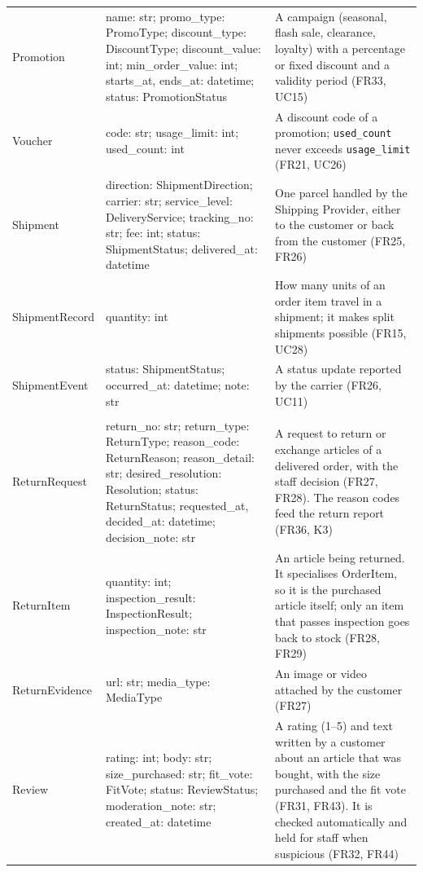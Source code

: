 {\begin{xltabular}{\textwidth}{@{}L{3.0cm} L{4.8cm} Y@{}}
\textsf{Promotion} & name: str; promo\_type: PromoType; discount\_type: DiscountType; discount\_value: int; min\_order\_value: int; starts\_at, ends\_at: datetime; status: PromotionStatus & A campaign (seasonal, flash sale, clearance, loyalty) with a percentage or fixed discount and a validity period (FR33, UC15) \\
\textsf{Voucher} & code: str; usage\_limit: int; used\_count: int & A discount code of a promotion; \texttt{used\_count} never exceeds \texttt{usage\_limit} (FR21, UC26) \\
\textsf{Shipment} & direction: ShipmentDirection; carrier: str; service\_level: DeliveryService; tracking\_no: str; fee: int; status: ShipmentStatus; delivered\_at: datetime & One parcel handled by the Shipping Provider, either to the customer or back from the customer (FR25, FR26) \\
\textsf{ShipmentRecord} & quantity: int & How many units of an order item travel in a shipment; it makes split shipments possible (FR15, UC28) \\
\textsf{ShipmentEvent} & status: ShipmentStatus; occurred\_at: datetime; note: str & A status update reported by the carrier (FR26, UC11) \\ \addlinespace
{} \\
\textsf{ReturnRequest} & return\_no: str; return\_type: ReturnType; reason\_code: ReturnReason; reason\_detail: str; desired\_resolution: Resolution; status: ReturnStatus; requested\_at, decided\_at: datetime; decision\_note: str & A request to return or exchange articles of a delivered order, with the staff decision (FR27, FR28). The reason codes feed the return report (FR36, K3) \\
\textsf{ReturnItem} & quantity: int; inspection\_result: InspectionResult; inspection\_note: str & An article being returned. It specialises \textsf{OrderItem}, so it is the purchased article itself; only an item that passes inspection goes back to stock (FR28, FR29) \\
\textsf{ReturnEvidence} & url: str; media\_type: MediaType & An image or video attached by the customer (FR27) \\
\textsf{Review} & rating: int; body: str; size\_purchased: str; fit\_vote: FitVote; status: ReviewStatus; moderation\_note: str; created\_at: datetime & A rating (1--5) and text written by a customer about an article that was bought, with the size purchased and the fit vote (FR31, FR43). It is checked automatically and held for staff when suspicious (FR32, FR44) \\

\end{xltabular}}
